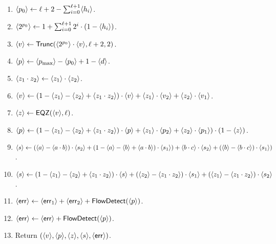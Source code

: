 \begin{enumerate}
\item $\langle p_0 \rangle \leftarrow \ell+2-\sum_{i=0}^{\ell+1} \langle h_i \rangle$.
\item $\langle 2^{p_0} \rangle \leftarrow 1+ \sum_{i=0}^{\ell+1} 2^i \cdot (1-\langle h_i \rangle)$.
\item $\langle v \rangle \leftarrow \mathsf{Trunc}(\langle 2^{p_0} \rangle \cdot \langle v \rangle,\ell+2,2)$.
\item $\langle p \rangle \leftarrow \langle p_{\max} \rangle-\langle p_0 \rangle+1-\langle d \rangle$.
\item $\langle z_1 \cdot z_2 \rangle \leftarrow \langle z_1 \rangle \cdot \langle z_2 \rangle$.
\item $\langle v \rangle \leftarrow (1-\langle z_1 \rangle-\langle z_2 \rangle +\langle z_1 \cdot z_2 \rangle) \cdot \langle v \rangle
		    + \langle z_1 \rangle \cdot \langle v_2 \rangle + \langle z_2 \rangle \cdot \langle v_1 \rangle$.
\item $\langle z \rangle \leftarrow \mathsf{EQZ}(\langle v \rangle,\ell)$.
\item $\langle p \rangle \leftarrow (1-\langle z_1 \rangle-\langle z_2 \rangle+\langle z_1 \cdot z_2 \rangle) \cdot \langle p \rangle
	+ \langle z_1 \rangle \cdot \langle p_2 \rangle 
	+ \langle z_2 \rangle \cdot \langle p_1 \rangle) \cdot (1-\langle z \rangle)$.
\item $\langle s \rangle \leftarrow (\langle a \rangle-\langle a \cdot b \rangle) \cdot \langle s_2 \rangle
	             + (1-\langle a \rangle-\langle b \rangle+\langle a \cdot b \rangle) \cdot \langle s_1 \rangle)
		     + \langle b \cdot c \rangle \cdot \langle s_2 \rangle
		     + (\langle b \rangle-\langle b \cdot c \rangle) \cdot \langle s_1 \rangle)$.
\item $\langle s \rangle \leftarrow (1-\langle z_1 \rangle-\langle z_2 \rangle+\langle z_1 \cdot z_2 \rangle) \cdot \langle s \rangle
	             + (\langle z_2 \rangle-\langle z_1 \cdot z_2 \rangle) \cdot \langle s_1 \rangle
		     + (\langle z_1 \rangle-\langle z_1 \cdot z_2 \rangle) \cdot \langle s_2 \rangle$.
\item $\langle \mathsf{err} \rangle \leftarrow \langle \mathsf{err}_1 \rangle + \langle \mathsf{err}_2 \rangle + \mathsf{FlowDetect}(\langle p \rangle)$.
\item $\langle \mathsf{err} \rangle \leftarrow \langle \mathsf{err} \rangle + \mathsf{FlowDetect}(\langle p \rangle)$.
\item Return $(\langle v \rangle,\langle p \rangle,\langle z \rangle,\langle s \rangle,\langle \mathsf{err} \rangle)$.
\end{enumerate}

